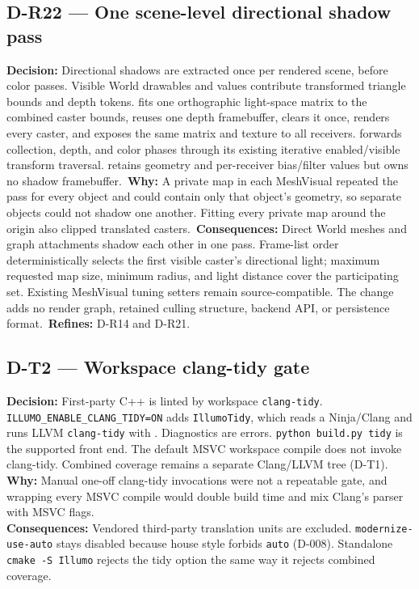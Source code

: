 \subsection*{D-R22 --- One scene-level directional shadow pass}
\begin{decisionbox}[title={D-R22 \quad 2026-09-16}]
\textbf{Decision:} Directional shadows are extracted once per rendered scene,
before color passes. Visible World drawables and
 values contribute transformed triangle
bounds and depth tokens.  fits one orthographic light-space
matrix to the combined caster bounds, reuses one depth framebuffer, clears it
once, renders every caster, and exposes the same matrix and texture to all
receivers.  forwards collection, depth, and color phases
through its existing iterative enabled/visible transform traversal.
 retains geometry and per-receiver bias/filter values but
owns no shadow framebuffer.\
\textbf{Why:} A private map in each MeshVisual repeated the pass for every
object and could contain only that object's geometry, so separate objects could
not shadow one another. Fitting every private map around the origin also clipped
translated casters.\
\textbf{Consequences:} Direct World meshes and graph attachments shadow each
other in one pass. Frame-list order deterministically selects the first visible
caster's directional light; maximum requested map size, minimum radius, and
light distance cover the participating set. Existing MeshVisual tuning setters
remain source-compatible. The change adds no render graph, retained culling
structure, backend API, or persistence format.\
\textbf{Refines:} D-R14 and D-R21.
\end{decisionbox}

\subsection*{D-T2 --- Workspace clang-tidy gate}
\begin{decisionbox}[title={D-T2 \quad 2026-08-30}]
\textbf{Decision:} First-party C++ is linted by workspace \texttt{clang-tidy}.
\texttt{ILLUMO\_ENABLE\_CLANG\_TIDY=ON} adds \texttt{IllumoTidy}, which reads a
Ninja/Clang \pathref{compile\_commands.json} and runs LLVM \texttt{clang-tidy}
with \pathref{.clang-tidy}. Diagnostics are errors.
\texttt{python build.py tidy} is the supported front end. The default MSVC
workspace compile does not invoke clang-tidy. Combined coverage remains a
separate Clang/LLVM tree (D-T1).\\
\textbf{Why:} Manual one-off clang-tidy invocations were not a repeatable gate,
and wrapping every MSVC compile would double build time and mix Clang's parser
with MSVC flags.\\
\textbf{Consequences:} Vendored third-party translation units are excluded.
\texttt{modernize-use-auto} stays disabled because house style forbids
\texttt{auto} (D-008). Standalone \texttt{cmake -S Illumo} rejects the tidy
option the same way it rejects combined coverage.
\end{decisionbox}

